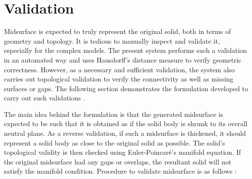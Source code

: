 \begin{center}
{\begin{tabular}[!htb]{@{}p{\myColWidthFactora\linewidth} p{\myColWidthFactora\linewidth}  p{\myColWidthFactora\linewidth}  p{\myColWidthFactora\linewidth} @{}}
\bottomrule
\end{tabular}
}
\label{tbl_fbcm}
\end{center}
	

\section{Validation}
\label{cagd:sec:validation}

Midsurface is expected to truly represent the original solid, both in terms of geometry and topology. It is tedious to manually inspect and validate it, especially for the complex models. The present system performs such a validation in an automated way and uses Hausdorff's distance measure to verify geometric correctness. However, as a necessary and sufficient validation, the system also carries out topological validation to verify the connectivity as well as missing surfaces or gaps. The following section demonstrates the formulation developed to carry out such validations \cite{YogeshCADandA2015}. 

The main idea behind the formulation is that the generated midsurface is expected to be such that it is obtained as if the solid body is shrunk to its overall neutral plane. As a reverse validation, if such a midsurface is thickened, it should represent a solid body as close to the original solid as possible. The solid's topological validity is then checked using Euler-Poincar\'e's manifold equation. If the original midsurface had any gaps or overlaps, the resultant solid will not satisfy the manifold condition. Procedure to validate midsurface is as follows \cite{YogeshCADandA2015}:   %

